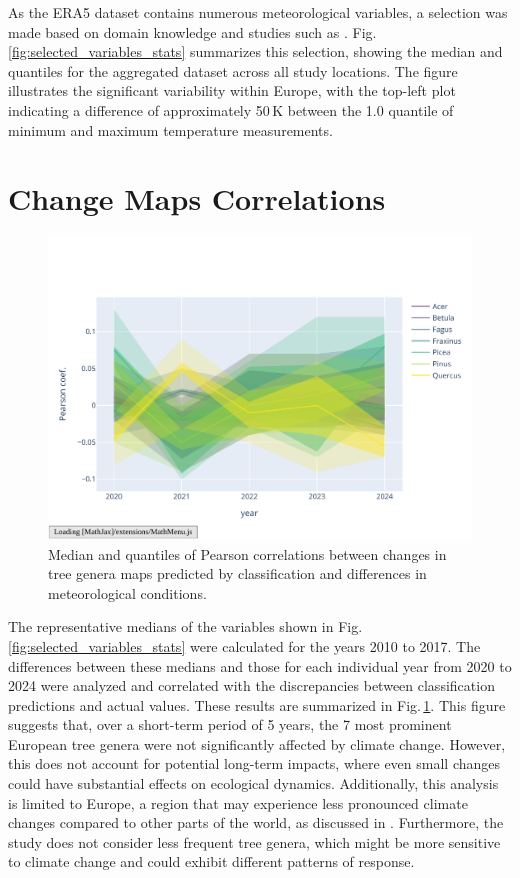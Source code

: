 As the ERA5 dataset contains numerous meteorological variables, a selection was made based on domain knowledge and studies such as \cite{climate_choice}. Fig.\,\ref{fig:selected_variables_stats} summarizes this selection, showing the median and quantiles for the aggregated dataset across all study locations. The figure illustrates the significant variability within Europe, with the top-left plot indicating a difference of approximately 50\,K between the 1.0 quantile of minimum and maximum temperature measurements.

\section{Change Maps Correlations}

\begin{figure}[ht]
    \centering
    \includegraphics[width=0.98\linewidth, trim={10pt 20pt 10pt 40pt}, clip]{figures/figures_climate/genus_corr.pdf}
    \caption{Median and quantiles of Pearson correlations between changes in tree genera maps predicted by classification and differences in meteorological conditions.}
    \label{fig:genus_corr}
\end{figure}

The representative medians of the variables shown in Fig.\,\ref{fig:selected_variables_stats} were calculated for the years 2010 to 2017. The differences between these medians and those for each individual year from 2020 to 2024 were analyzed and correlated with the discrepancies between classification predictions and actual values. These results are summarized in Fig.\,\ref{fig:genus_corr}. This figure suggests that, over a short-term period of 5 years, the 7 most prominent European tree genera were not significantly affected by climate change. However, this does not account for potential long-term impacts, where even small changes could have substantial effects on ecological dynamics. Additionally, this analysis is limited to Europe, a region that may experience less pronounced climate changes compared to other parts of the world, as discussed in \cite{hoegh2018climate}. Furthermore, the study does not consider less frequent tree genera, which might be more sensitive to climate change and could exhibit different patterns of response.

